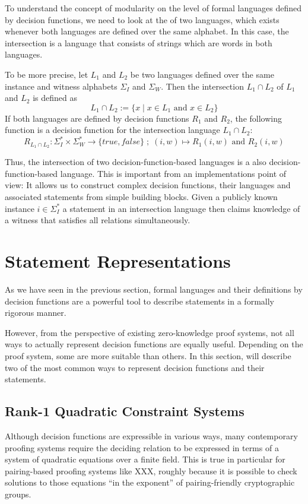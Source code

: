 To understand the concept of modularity on the level of formal languages defined by decision functions, we need to look at the  of two languages, which exists whenever both languages are defined over the same alphabet. In this case, the intersection is a language that consists of strings which are words in both languages. 

To be more precise, let $L_1$ and $L_2$ be two languages defined over the same instance and witness alphabets $\Sigma_I$ and $\Sigma_W$. Then the intersection $L_1 \cap L_2$ of $L_1$ and $L_2$ is defined as
\begin{equation}
L_1 \cap L_2 := \{x\;|\; x\in L_1 \text{ and } x\in L_2\}
\end{equation} 
If both languages are defined by decision functions $R_1$ and $R_2$, the following function is a decision function for the intersection language $L_1 \cap L_2$:
\begin{equation}
R_{L_1 \cap L_2}: \Sigma_I^* \times \Sigma_W^* \to \{true, false\}\;;\;
(i,w) \mapsto R_1(i,w) \text{ and } R_2(i,w)
\end{equation}

Thus, the intersection of two decision-function-based languages is a also decision-function-based language. This is important from an implementations point of view: It allows us to construct complex decision functions, their languages and associated statements from simple building blocks. Given a publicly known instance $i\in \Sigma_I^*$ a statement in an intersection language then claims knowledge of a witness that satisfies all relations simultaneously. 

\section{Statement Representations}\label{sec:statement-representations}
As we have seen in the previous section, formal languages and their definitions by decision functions are a powerful tool to describe statements in a formally rigorous manner. 

However, from the perspective of existing zero-knowledge proof systems, not all ways to actually represent decision functions are equally useful. Depending on the proof system, some are more suitable than others. In this section, will describe two of the most common ways to represent decision functions and their statements.
\subsection{Rank-1 Quadratic Constraint Systems}
Although decision functions are expressible in various ways, many contemporary proofing systems require the deciding relation to be expressed in terms of a system of quadratic equations over a finite field. This is true in particular for pairing-based proofing systems like XXX, roughly because it is possible to check solutions to those equations ``in the exponent'' of pairing-friendly cryptographic groups.

